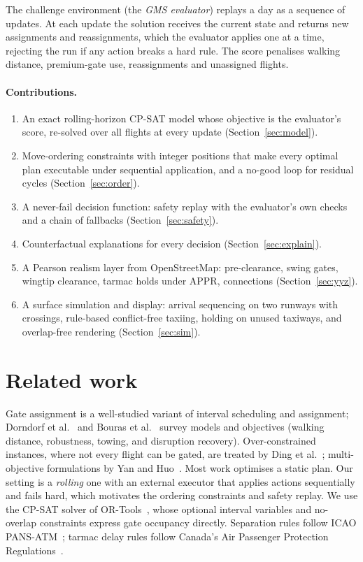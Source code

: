 \documentclass[11pt]{article}
\theoremstyle{remark}
\begin{document}
The challenge environment (the \emph{GMS evaluator}) replays a day as a sequence of updates. At each
update the solution receives the current state and returns new assignments and reassignments, which
the evaluator applies one at a time, rejecting the run if any action breaks a hard rule. The score
penalises walking distance, premium-gate use, reassignments and unassigned flights.

\paragraph{Contributions.}
\begin{enumerate}[leftmargin=*,itemsep=2pt]
\item An exact rolling-horizon CP-SAT model whose objective is the evaluator's score, re-solved over
      all flights at every update (Section~\ref{sec:model}).
\item Move-ordering constraints with integer positions that make every optimal plan executable under
      sequential application, and a no-good loop for residual cycles (Section~\ref{sec:order}).
\item A never-fail decision function: safety replay with the evaluator's own checks and a chain of
      fallbacks (Section~\ref{sec:safety}).
\item Counterfactual explanations for every decision (Section~\ref{sec:explain}).
\item A Pearson realism layer from OpenStreetMap: pre-clearance, swing gates, wingtip clearance,
      tarmac holds under APPR, connections (Section~\ref{sec:yyz}).
\item A surface simulation and display: arrival sequencing on two runways with crossings,
      rule-based conflict-free taxiing, holding on unused taxiways, and overlap-free rendering
      (Section~\ref{sec:sim}).
\end{enumerate}

\section{Related work}
Gate assignment is a well-studied variant of interval scheduling and assignment; Dorndorf et
al.~\cite{dorndorf2007} and Bouras et al.~\cite{bouras2014} survey models and objectives (walking
distance, robustness, towing, and disruption recovery). Over-constrained instances, where not every
flight can be gated, are treated by Ding et al.~\cite{ding2005}; multi-objective formulations by
Yan and Huo~\cite{yan2001}. Most work optimises a static plan. Our setting is a \emph{rolling} one
with an external executor that applies actions sequentially and fails hard, which motivates the
ordering constraints and safety replay. We use the CP-SAT solver of OR-Tools~\cite{ortools,perron2023},
whose optional interval variables and no-overlap constraints express gate occupancy directly.
Separation rules follow ICAO PANS-ATM~\cite{icao4444}; tarmac delay rules follow Canada's Air
Passenger Protection Regulations~\cite{appr}.
\end{document}
